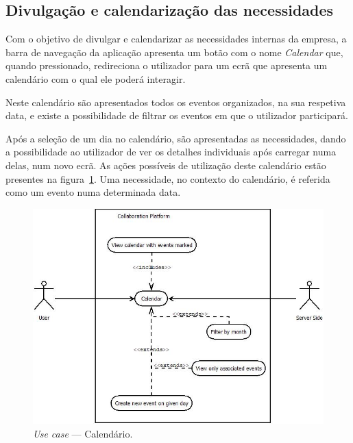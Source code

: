 \subsection{Divulgação e calendarização das necessidades}

Com o objetivo de divulgar e calendarizar as necessidades internas da empresa, a barra de navegação da aplicação apresenta um botão com o nome \textit{Calendar} que, quando pressionado, 
redireciona o utilizador para um ecrã que apresenta um calendário com o qual ele poderá interagir. 
\par
Neste calendário são apresentados todos os eventos organizados, na sua respetiva data, e existe a possibilidade de filtrar os eventos em que o utilizador participará. 
\par
Após a seleção de um dia no calendário, são apresentadas as necessidades, dando a possibilidade ao utilizador de ver os detalhes individuais após carregar numa delas, 
num novo ecrã.
As ações possíveis de utilização deste calendário estão presentes na figura~\ref{fig:uc:calendar}. 
Uma necessidade, no contexto do calendário, é referida como um evento numa determinada data. 

\begin{figure}[H]
    \centering
    \includegraphics[scale=0.6]{figures/Calendar use case.jpeg}
    \caption{\textit{Use case} --- Calendário.}\label{fig:uc:calendar}
\end{figure}

